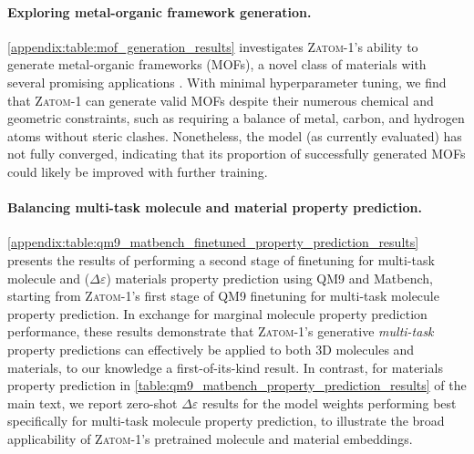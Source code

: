 \documentclass{article}
\theoremstyle{plain}
\theoremstyle{definition}
\theoremstyle{remark}
\begin{document}
\paragraph{Exploring metal-organic framework generation.} \cref{appendix:table:mof_generation_results} investigates \textsc{Zatom-1}'s ability to generate metal-organic frameworks (MOFs), a novel class of materials with several promising applications \citep{kitagawa2014metal}. With minimal hyperparameter tuning, we find that \textsc{Zatom-1} can generate valid MOFs despite their numerous chemical and geometric constraints, such as requiring a balance of metal, carbon, and hydrogen atoms without steric clashes. Nonetheless, the model (as currently evaluated) has not fully converged, indicating that its proportion of successfully generated MOFs could likely be improved with further training.

\paragraph{Balancing multi-task molecule and material property prediction.} \cref{appendix:table:qm9_matbench_finetuned_property_prediction_results} presents the results of performing a second stage of finetuning for multi-task molecule and ($\Delta\varepsilon$) materials property prediction using QM9 and Matbench, starting from \textsc{Zatom-1}'s first stage of QM9 finetuning for multi-task molecule property prediction. In exchange for marginal molecule property prediction performance, these results demonstrate that \textsc{Zatom-1}'s generative \textit{multi-task} property predictions can effectively be applied to both 3D molecules and materials, to our knowledge a first-of-its-kind result. In contrast, for materials property prediction in \cref{table:qm9_matbench_property_prediction_results} of the main text, we report zero-shot $\Delta\varepsilon$ results for the model weights performing best specifically for multi-task molecule property prediction, to illustrate the broad applicability of \textsc{Zatom-1}'s pretrained molecule and material embeddings.
\end{document}
